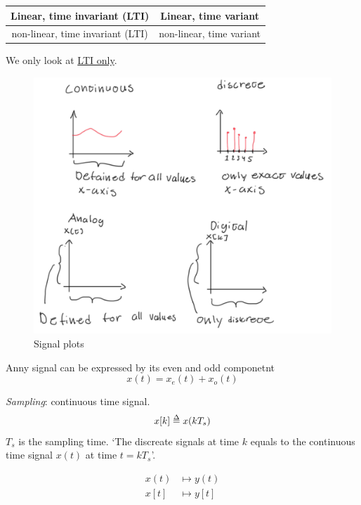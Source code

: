 \documentclass{article}
\begin{document}
\begin{center}
\begin{tabular}{ | c | c |}
    \hline
    \textbf{Linear, time invariant (LTI)} & Linear, time variant \\
    \hline
    non-linear, time invariant (LTI) & non-linear, time variant \\
    \hline
\end{tabular}
\end{center}

We only look at \underline{LTI only}.


\begin{figure}[!h]
    \centering
    \includegraphics[width=12cm]{image/caractaristic-signal-plots.pdf}
    \caption{Signal plots}
\end{figure}

Anny signal can be expressed by its even and odd componetnt
\begin{equation}
    x(t) = x_e(t) + x_o(t)
\end{equation}

\textit{Sampling}: continuous time signal.
\begin{equation}
    x[k] \delequal x(k T_s)
\end{equation}
$T_s$ is the sampling time.
`The discreate signals at time $k$ equals to 
the continuous time signal $x(t)$ at time $t = kT_s$'.

\begin{align}
    x(t)  &\mapsto y(t)    \\
    x[t]  &\mapsto y[t]
\end{align}
\end{document}
